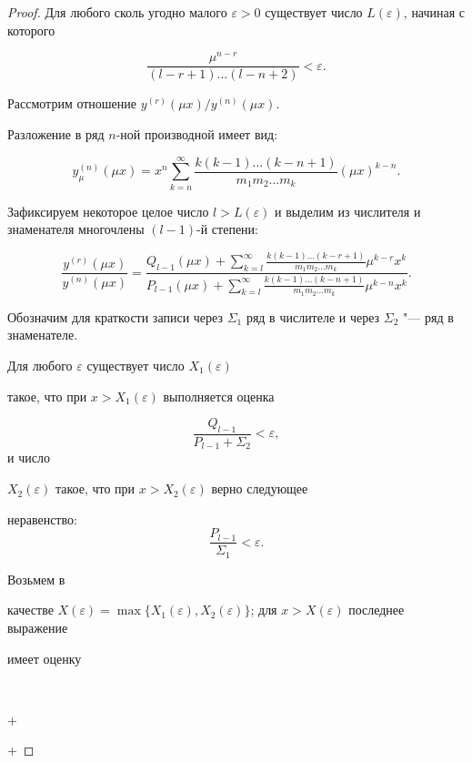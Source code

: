 \begin{proof}

Для любого сколь угодно малого $\varepsilon > 0$ существует число $L(\varepsilon)$, начиная с которого %

$$\frac{\mu^{n-r}}{(l-r+1) \dots (l-n+2)} < \varepsilon.$$



Рассмотрим отношение ${y^{(r)}(\mu x)}/{y^{(n)}(\mu x)}.$

Разложение в ряд $n$-ной производной имеет вид:

$$y^{(n)}_\mu (\mu x)= x^n \sum\limits_{k=n}^\infty \frac{k(k-1) \dots (k-n+1)}{m_1 m_2 \dots m_k}(\mu x)^{k-n}.$$

Зафиксируем некоторое целое число $l > L(\varepsilon)$ и выделим из числителя и знаменателя многочлены $(l-1)$-й степени:

$$

\frac{y^{(r)}(\mu x)}{y^{(n)}(\mu x)}=\frac{Q_{l-1}(\mu x)+ \sum_{k=l}^\infty \frac{k(k-1) \ldots

(k-r+1)}{m_1 m_2 \ldots m_k}\mu^{k-r} x^k}{P_{l-1}(\mu x) + \sum_{k=l}^\infty \frac{k(k-1) \ldots

(k-n+1)}{m_1 m_2 \ldots m_k}\mu^{k-n} x^k}.

$$

Обозначим для краткости записи через $\Sigma_1$ ряд в числителе и через $\Sigma_2$ "--- ряд в знаменателе.



Для любого $\varepsilon$ существует число $X_1(\varepsilon)$

такое, что при $x > X_1(\varepsilon)$ выполняется оценка

$$\frac{Q_{l-1}}{P_{l-1} + \Sigma_2} < \varepsilon,$$ и число

$X_2(\varepsilon)$ такое, что при $x > X_2(\varepsilon)$ верно следующее

неравенство: $$\frac{P_{l-1}}{\Sigma_1} < \varepsilon.$$ 

Возьмем в

качестве $X(\varepsilon) = \max \{X_1(\varepsilon),

X_2(\varepsilon)\}$;  для $x > X(\varepsilon)$ последнее выражение

имеет оценку

$$

  \leq \varepsilon +

\leq \varepsilon +


\end{proof}
